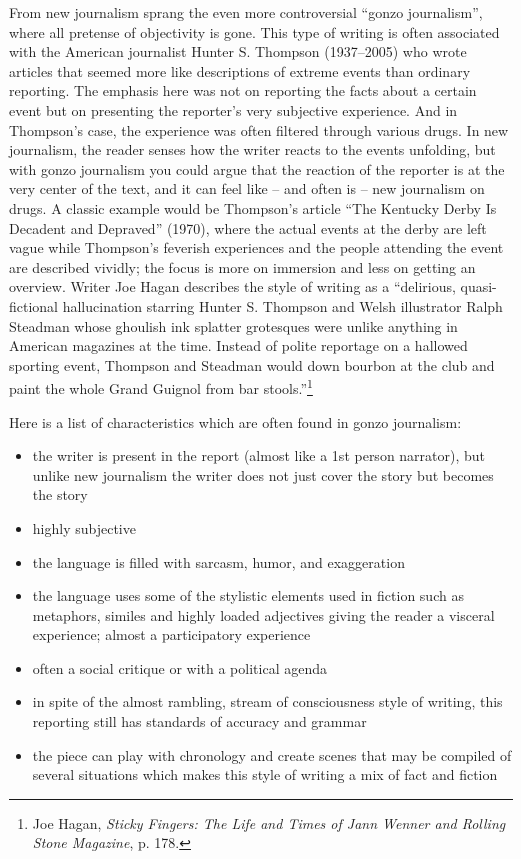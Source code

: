 \documentclass[10pt,a4paper]{article}
\newcommand{\glos}[3]{\dotuline{#1}\marginpar{\scriptsize\textit{#3} #2}}
\begin{document}
From new journalism sprang the even more controversial ``gonzo journalism'', where all pretense of objectivity is gone. This type of writing is often associated with the American journalist Hunter S. Thompson (1937--2005) who wrote articles that seemed more like \glos{frenetic}{hektisk; kaotisk}{adj.} descriptions of extreme events than ordinary reporting. The emphasis here was not on reporting the facts about a certain event but on presenting the reporter's very subjective experience. And in Thompson's case, the experience was often filtered through various drugs. In new journalism, the reader senses how the writer reacts to the events unfolding, but with gonzo journalism you could argue that the reaction of the reporter is at the very center of the text, and it can feel like -- and often is -- new journalism on drugs. A classic example would be Thompson's article ``The Kentucky Derby Is Decadent and Depraved'' (1970), where the actual events at the derby are left vague while Thompson's feverish experiences and the people attending the event are described vividly; the focus is more on immersion and less on getting an overview. Writer Joe Hagan describes the style of writing as a ``delirious, quasi-fictional hallucination starring Hunter S. Thompson and Welsh illustrator Ralph Steadman whose ghoulish ink splatter grotesques were unlike anything in American magazines at the time. Instead of polite reportage on a hallowed sporting event, Thompson and Steadman would down bourbon at the club and paint the whole Grand Guignol from bar stools.''\footnote{Joe Hagan, \textit{Sticky Fingers: The Life and Times of Jann Wenner and Rolling Stone Magazine}, p. 178.}

Here is a list of characteristics which are often found in gonzo journalism:

\begin{itemize}
    \item the writer is present in the report (almost like a 1st person narrator), but unlike new journalism the writer does not just cover the story but becomes the story
    \item highly subjective
    \item the language is filled with sarcasm, humor, and exaggeration
    \item the language uses some of the stylistic elements used in fiction such as metaphors, similes and highly loaded adjectives giving the reader a visceral experience; almost a participatory experience
    \item often a social critique or with a political agenda
    \item in spite of the almost rambling, stream of consciousness style of writing, this reporting still has standards of accuracy and grammar
    \item the piece can play with chronology and create scenes that may be compiled of several situations which makes this style of writing a mix of fact and fiction
\end{itemize}
\end{document}
